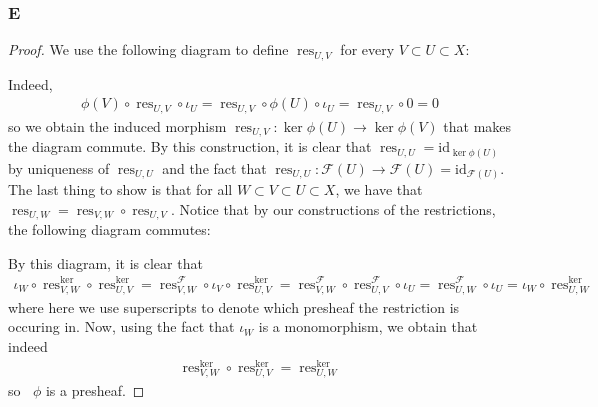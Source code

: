 \documentclass{article}
\newcommand{\id}{\mathrm{id}}
\newcommand{\fF}{\mathscr{F}}
\newcommand{\fG}{\mathscr{G}}
\DeclareMathOperator{\res}{res}
\DeclareMathOperator{\kerpre}{\ker_{\text{pre}}}
\begin{document}
\subsubsection{E}\label{2.3.E}
\begin{proof}
    We use the following diagram to define $\res_{U,V}$ for every $V\subset U\subset X$:
    \begin{center}
    \end{center}
    Indeed,
    \begin{align*}
        \phi(V)\circ \res_{U,V}\circ \iota_U=\res_{U,V}\circ \phi(U)\circ \iota_U=\res_{U,V}\circ 0=0
    \end{align*}
    so we obtain the induced morphism $\res_{U,V}:\ker \phi(U)\to \ker \phi(V)$ that makes the diagram commute. By this construction, it is clear that $\res_{U,U}=\id_{\ker \phi(U)}$ by uniqueness of $\res_{U,U}$ and the fact that $\res_{U,U}:\fF(U)\to \fF(U)=\id_{\fF(U)}$. The last thing to show is that for all $W\subset V\subset U\subset X$, we have that $\res_{U,W}=\res_{V,W}\circ \res_{U,V}$. Notice that by our constructions of the restrictions, the following diagram commutes:
    \begin{center}
    \end{center}
    By this diagram, it is clear that
    \begin{align*}
        \iota_W\circ \res_{V,W}^{\ker}\circ \res_{U,V}^{\ker}=\res_{V,W}^\fF \circ \iota_V\circ \res_{U,V}^{\ker}=\res_{V,W}^\fF \circ \res_{U,V}^\fF \circ \iota_U=\res_{U,W}^\fF \circ \iota_U=\iota_W\circ \res_{U,W}^{\ker }
    \end{align*}
    where here we use superscripts to denote which presheaf the restriction is occuring in. Now, using the fact that $\iota_W$ is a monomorphism, we obtain that indeed
    \begin{align*}
        \res_{V,W}^{\ker}\circ \res_{U,V}^{\ker}=\res_{U,W}^{\ker}
    \end{align*}
    so $\kerpre \phi$ is a presheaf.
\end{proof}
\end{document}
